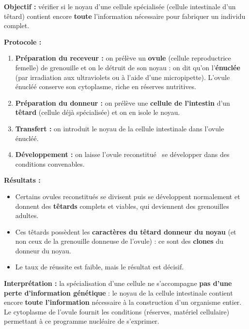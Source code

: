\documentclass[11pt]{article}
\begin{document}
\begin{experience}
\textbf{Objectif :} vérifier si le noyau d'une cellule spécialisée (cellule intestinale d'un têtard) contient encore \textbf{toute} l'information nécessaire pour fabriquer un individu complet.

\textbf{Protocole :}
\begin{enumerate}
    \item \textbf{Préparation du receveur :} on prélève un \textbf{ovule} (cellule reproductrice femelle) de grenouille et on le détruit de son noyau : on dit qu'on l'\textbf{énuclée} (par irradiation aux ultraviolets ou à l'aide d'une micropipette). L'ovule énucléé conserve son cytoplasme, riche en réserves nutritives.
    \item \textbf{Préparation du donneur :} on prélève une \textbf{cellule de l'intestin} d'un \textbf{têtard} (cellule déjà spécialisée) et on en isole le noyau.
    \item \textbf{Transfert :} on introduit le noyau de la cellule intestinale dans l'ovule énucléé.
    \item \textbf{Développement :} on laisse l'ovule \og reconstitué~\fg{} se développer dans des conditions convenables.
\end{enumerate}

\textbf{Résultats :}
\begin{itemize}
    \item Certains ovules reconstitués se divisent puis se développent normalement et donnent des \textbf{têtards} complets et viables, qui deviennent des grenouilles adultes.
    \item Ces têtards possèdent les \textbf{caractères du têtard donneur du noyau} (et non ceux de la grenouille donneuse de l'ovule) : ce sont des \textbf{clones} du donneur du noyau.
    \item Le taux de réussite est faible, mais le résultat est décisif.
\end{itemize}

\textbf{Interprétation :} la spécialisation d'une cellule ne s'accompagne \textbf{pas d'une perte d'information génétique} : le noyau de la cellule intestinale contient encore \textbf{toute l'information} nécessaire à la construction d'un organisme entier. Le cytoplasme de l'ovule fournit les conditions (réserves, matériel cellulaire) permettant à ce programme nucléaire de s'exprimer.
\end{experience}
\end{document}
